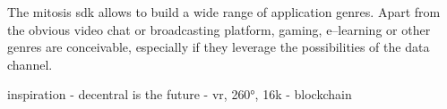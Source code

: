 The \gls{mitosis} \gls{sdk} allows to build a wide range of application genres. Apart from the obvious video chat or broadcasting platform, gaming, e–learning or other genres are conceivable, especially if they leverage the possibilities of the data channel.

inspiration
- decentral is the future
- vr, 260°, 16k
- blockchain
